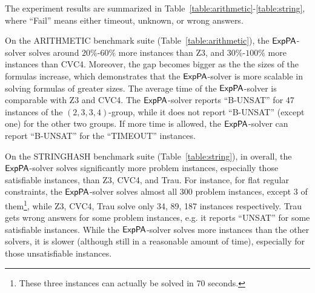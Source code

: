 The experiment results are summarized in Table~\ref{table:arithmetic}-\ref{table:string}, where ``Fail'' means either timeout, unknown, or wrong answers. 

On the ARITHMETIC benchmark suite (Table~\ref{table:arithmetic}), the ${\sf ExpPA}$-solver solves around $20\%$-$60\%$ more instances than Z3, and $30\%$-$100\%$ more instances than CVC4. Moreover, the gap becomes bigger as the the sizes of the formulas increase, which demonstrates that the ${\sf ExpPA}$-solver is more scalable in solving formulas of greater sizes. The average time of the ${\sf ExpPA}$-solver is comparable with Z3 and CVC4. The ${\sf ExpPA}$-solver reports ``B-UNSAT'' for 47 instances of the $(2, 3, 3, 4)$-group, while it does not report ``B-UNSAT'' (except one) for the other two groups. If more time is allowed, the ${\sf ExpPA}$-solver can report ``B-UNSAT'' for the ``TIMEOUT'' instances. 



On the STRINGHASH benchmark suite (Table~\ref{table:string}), in overall, the ${\sf ExpPA}$-solver solves significantly more problem instances, especially those satisfiable instances, than Z3, CVC4, and Trau. For instance, for flat regular constraints, the ${\sf ExpPA}$-solver solves almost all 300 problem instances, except 3 of them\footnote{These three instances can actually be solved in 70 seconds.}, while  Z3, CVC4, Trau solve only 34, 89, 187 instances respectively.  Trau gets wrong answers for some problem instances, e.g. it reports ``UNSAT'' for some satisfiable instances. While the ${\sf ExpPA}$-solver solves more instances than the other solvers, it is slower (although still in a reasonable amount of time), especially for those unsatisfiable instances.


%



